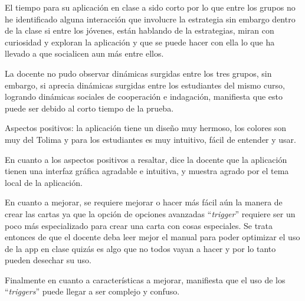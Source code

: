 \begin{displayquote}
	El tiempo para su aplicación en clase a sido corto por lo que entre los grupos no he identificado 
	alguna interacción que involucre la estrategia sin embargo dentro de la clase si entre los jóvenes, 
	están hablando de la estrategias, miran con curiosidad y exploran la aplicación y que se puede hacer
	con ella lo que ha llevado a que socialicen aun más entre ellos.
\end{displayquote}

La docente no pudo observar dinámicas surgidas entre los tres grupos, sin embargo, si aprecia dinámicas 
surgidas entre los estudiantes del mismo curso, logrando dinámicas sociales de cooperación e indagación, 
manifiesta que esto puede ser debido al corto tiempo de la prueba.

\begin{displayquote}
	Aspectos positivos: la aplicación tiene un diseño muy hermoso, los colores son muy del Tolima y para 
	los estudiantes es muy intuitivo, fácil de entender y usar. 
\end{displayquote}

En cuanto a los aspectos positivos a resaltar, dice la docente que la aplicación tienen una interfaz gráfica 
agradable e intuitiva, y muestra agrado por el tema local de la aplicación.

\begin{displayquote}
	En cuanto a mejorar, se requiere mejorar o hacer más fácil aún la manera de crear las cartas ya que la 
	opción de opciones avanzadas ``\textit{trigger}'' requiere ser un poco más especializado para crear una carta 
	con cosas especiales. Se trata entonces de que el docente deba leer mejor el manual para poder 
	optimizar el uso de la app en clase quizás es algo que no todos vayan a hacer y por lo tanto pueden 
	desechar su uso.
\end{displayquote}

Finalmente en cuanto a características a mejorar, manifiesta que el uso de los ``\textit{triggers}'' puede 
llegar a ser complejo y confuso.

